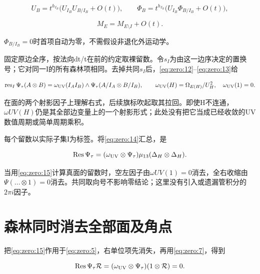 \documentclass[11pt,a4paper,oneside]{ctexrep}
\theoremstyle{cnplain}
\theoremstyle{definition}
\theoremstyle{remark}
\begin{document}
\begin{equation}
U_B=t^{h_{I_B}}\bigl(U_{I_B}U_{B/I_B}+O(t)\bigr),\qquad
 \Phi_B=t^{h_{I_B}}\bigl(U_{I_B}\Phi_{B/I_B}+O(t)\bigr),         \label{eq:zero:13}
\end{equation}

\begin{equation}
M_E=M_{E\setminus I}+O(t).
\end{equation}

\(\Phi _{B/I_B}=0\)时首项自动为零，不需假设非退化外运动学。

固定原边全序，按法向dt/t在前的约定取裸留数。令\(s_I\)为由这一边序决定的置换号；它对同一I的所有森林项相同。去掉共同\(s_I\)后，\eqref{eq:zero:12}--\eqref{eq:zero:13}给

\begin{equation}
\operatorname{res}_I\Psi_\tau(A\otimes B)
 =\omega_{\rm UV}(I_A I_B)\wedge
             \Psi_\tau(A/I_A\otimes B/I_B),\qquad
 \omega_{\rm UV}(H)=\Omega_{E(H)}/U_H^2,\quad\omega_{\rm UV}(1)=0.       \label{eq:zero:14}
\end{equation}

在面的两个射影因子上理解右式，后续旗标吹起取其拉回。即使H不连通，\(\omega UV(H)\)仍是其全部边变量上的一个射影形式；此处没有把它当成已经收敛的UV数值周期或简单周期乘积。

每个留数以实际子集I为标签。将\eqref{eq:zero:14}汇总，是

\begin{equation}
\operatorname{Res}\Psi_\tau
   =(\omega_{\rm UV}\otimes\Psi_\tau)
                         \mu_{13}(\Delta_H\otimes\Delta_H).   \label{eq:zero:15}
\end{equation}

当用\eqref{eq:zero:15}计算真面的留数时，空左因子由\(\omega UV(1)=0\)消去，全右收缩由\(\Psi (...\otimes 1)=0\)消去。共同取向号不影响零结论；这里没有引入或遗漏管积分的\(2\pi i\)因子。

\section{森林同时消去全部面及角点}\label{sec:zero:6}

把\eqref{eq:zero:15}作用于\eqref{eq:zero:5}，右单位项先消失，再用\eqref{eq:zero:7}，得到

\begin{equation}
\operatorname{Res}\Psi_\tau\mathcal R
 =(\omega_{\rm UV}\otimes\Psi_\tau)(1\otimes\mathcal R)=0.       \label{eq:zero:16}
\end{equation}
\end{document}
